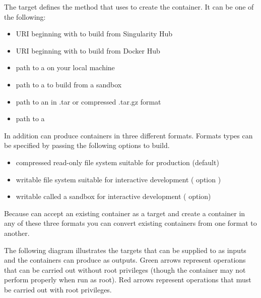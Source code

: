 \documentclass[letterpaper,10pt,english]{sphinxmanual}
\begin{document}
The target defines the method that  uses to create the container. It
can be one of the following:
\begin{itemize}
\item {} 
URI beginning with  to build from Singularity Hub

\item {} 
URI beginning with  to build from Docker Hub

\item {} 
path to a  on your local machine

\item {} 
path to a  to build from a sandbox

\item {} 
path to an  in .tar or compressed .tar.gz format

\item {} 
path to a 

\end{itemize}

In addition  can produce containers in three different formats. Formats
types can be specified by passing the following options to build.
\begin{itemize}
\item {} 
compressed read-only  file system suitable for production
(default)

\item {} 
writable  file system suitable for interactive development ( 
option )

\item {} 
writable  called a sandbox for interactive
development (  option)

\end{itemize}

Because  can accept an existing container as a target and create a
container in any of these three formats you can convert existing
containers from one format to another.

The following diagram illustrates the targets that can be supplied to 
as inputs and the containers  can produce as outputs. Green arrows
represent operations that can be carried out without root privileges
(though the container may not perform properly when run as root). Red
arrows represent operations that must be carried out with root
privileges.
\end{document}
